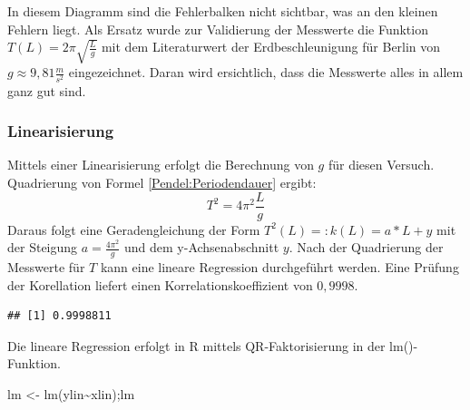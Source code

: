 \documentclass[
  9pt,
]{article}
\newenvironment{Shaded}{\begin{snugshade}}{\end{snugshade}}
\newcommand{\AttributeTok}[1]{\textcolor[rgb]{0.77,0.63,0.00}{#1}}
\newcommand{\CommentTok}[1]{\textcolor[rgb]{0.56,0.35,0.01}{\textit{#1}}}
\newcommand{\DecValTok}[1]{\textcolor[rgb]{0.00,0.00,0.81}{#1}}
\newcommand{\FunctionTok}[1]{\textcolor[rgb]{0.00,0.00,0.00}{#1}}
\newcommand{\NormalTok}[1]{#1}
\newcommand{\OtherTok}[1]{\textcolor[rgb]{0.56,0.35,0.01}{#1}}
\newcommand{\SpecialCharTok}[1]{\textcolor[rgb]{0.00,0.00,0.00}{#1}}
\newcommand{\StringTok}[1]{\textcolor[rgb]{0.31,0.60,0.02}{#1}}
\begin{document}
In diesem Diagramm sind die Fehlerbalken nicht sichtbar, was an den
kleinen Fehlern liegt. Als Ersatz wurde zur Validierung der Messwerte
die Funktion \(T(L)=2\pi\sqrt{\frac{L}{g}}\) mit dem Literaturwert der
Erdbeschleunigung für Berlin von \(g\approx 9,81\frac{m}{s^2}\)
eingezeichnet. Daran wird ersichtlich, dass die Messwerte alles in allem
ganz gut sind.

\hypertarget{linearisierung}{%
\subsubsection{Linearisierung}\label{linearisierung}}

Mittels einer Linearisierung erfolgt die Berechnung von \(g\) für diesen
Versuch. Quadrierung von Formel \ref{Pendel:Periodendauer} ergibt:
\[T^2 = 4\pi^2\frac{L}{g}\] Daraus folgt eine Geradengleichung der Form
\(T^2(L)=:k(L)=a*L+y\) mit der Steigung \(a=\frac{4\pi^2}{g}\) und dem
y-Achsenabschnitt \(y\). Nach der Quadrierung der Messwerte für \(T\)
kann eine lineare Regression durchgeführt werden. Eine Prüfung der
Korellation liefert einen Korrelationskoeffizient von \(0,9998\).

\begin{Shaded}
\end{Shaded}

\begin{verbatim}
## [1] 0.9998811
\end{verbatim}

Die lineare Regression erfolgt in R mittels QR-Faktorisierung in der
lm()-Funktion.

\begin{Shaded}
\begin{Highlighting}[]
\NormalTok{lm }\OtherTok{\textless{}{-}} \FunctionTok{lm}\NormalTok{(ylin}\SpecialCharTok{\textasciitilde{}}\NormalTok{xlin);lm}
\end{Highlighting}
\end{Shaded}
\end{document}
